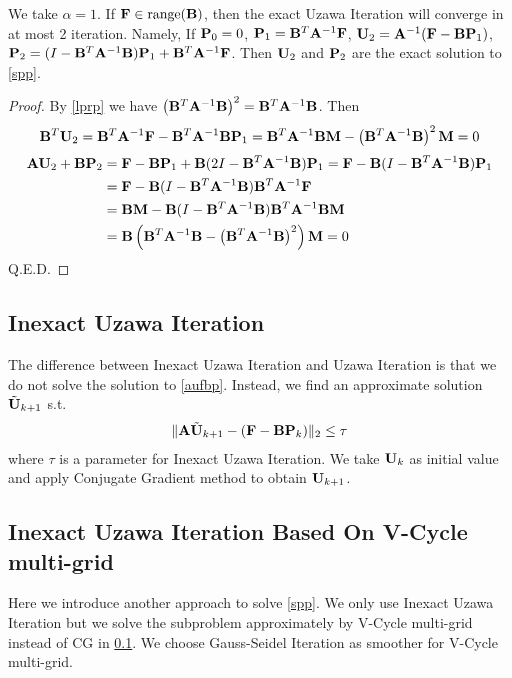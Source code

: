 \documentclass[english]{pkupaper}
\newenvironment{eqt}{\begin{equation}\begin{aligned}}{\end{aligned}\end{equation}}
\begin{document}
\begin{proposition}
\label{uzawa_conv}
We take $\alpha = 1$. If $\mathbf{F}\in\mathrm{range}(\mathbf{B})$, then the exact Uzawa Iteration will converge in at most 2 iteration. Namely, If $\mathbf{P}_0=0$, $\mathbf{P}_1 = \mathbf{B}^T\mathbf{A}^{-1}\mathbf{F}$, $\mathbf{U}_2=\mathbf{A}^{-1}(\mathbf{F}-\mathbf{B}\mathbf{P}_1)$, $\mathbf{P}_2 = (I-\mathbf{B}^T\mathbf{A}^{-1}\mathbf{B})\mathbf{P}_1+\mathbf{B}^T\mathbf{A}^{-1}\mathbf{F}$. Then $\mathbf{U}_2$ and $\mathbf{P}_2$ are the exact solution to \ref{spp}.
\end{proposition}
\begin{proof}
By \ref{lprp} we have $\left(\mathbf{B}^T\mathbf{A}^{-1}\mathbf{B}\right)^2=\mathbf{B}^T\mathbf{A}^{-1}\mathbf{B}$. Then
\begin{eqt}
\mfB^T\mfU_2 = \mfB^T\mfA^{-1}\mfF-\mfB^T\mfA^{-1}\mfB\mfP_1=\mfB^T\mfA^{-1}\mfB\mfM-\lp\mfB^T\mfA^{-1}\mfB\rp^2\mfM=0
\end{eqt}
\begin{eqt}
\mfA\mfU_2+\mfB\mfP_2&=\mfF-\mfB\mfP_1+\mfB(2I-\mfB^T\mfA^{-1}\mfB)\mfP_1=\mfF-\mfB(I-\mfB^T\mfA^{-1}\mfB)\mfP_1\\
&=\mfF-\mfB(I-\mfB^T\mfA^{-1}\mfB)\mfB^T\mfA^{-1}\mfF\\
&=\mfB\mfM-\mfB(I-\mfB^T\mfA^{-1}\mfB)\mfB^T\mfA^{-1}\mfB\mfM\\
&=\mfB\lp\mfB^T\mfA^{-1}\mfB-\lp\mfB^T\mfA^{-1}\mfB\rp^2\rp\mfM=0
\end{eqt}
Q.E.D.
\end{proof}
\subsection{Inexact Uzawa Iteration}
\label{ssec:num_iui}
The difference between Inexact Uzawa Iteration and Uzawa Iteration is that we do not solve the solution to \ref{aufbp}. Instead, we find an approximate solution $\tilde {\mathbf{U}}_{k+1}$ s.t. 
\begin{eqt}
\|\mfA\tilde\mfU_{k+1}-(\mfF-\mfB\mfP_k)\|_2\leq\tau
\end{eqt}
where $\tau$ is a parameter for Inexact Uzawa Iteration. We take $\mathbf{U}_k$ as initial value and apply Conjugate Gradient method to obtain $\mathbf{U}_{k+1}$. 

\subsection{Inexact Uzawa Iteration Based On V-Cycle multi-grid}
Here we introduce another approach to solve \ref{spp}. We only use Inexact Uzawa Iteration but we solve the subproblem approximately by V-Cycle multi-grid instead of CG in \ref{ssec:num_iui}. We choose Gauss-Seidel Iteration as smoother for V-Cycle multi-grid.
\end{document}
